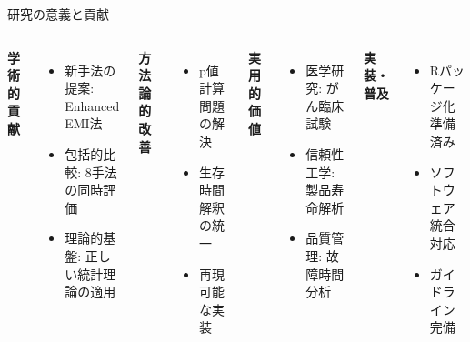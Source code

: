 \documentclass[11pt,aspectratio=169]{beamer}
\begin{document}
\begin{frame}{研究の意義と貢献}
\begin{columns}
\textbf{学術的貢献}
\begin{itemize}
\item \textcolor{primary}{新手法の提案}: Enhanced EMI法
\item \textcolor{primary}{包括的比較}: 8手法の同時評価
\item \textcolor{primary}{理論的基盤}: 正しい統計理論の適用
\end{itemize}

\vspace{1em}
\textbf{方法論的改善}
\begin{itemize}
\item p値計算問題の解決
\item 生存時間解釈の統一
\item 再現可能な実装
\end{itemize}

\textbf{実用的価値}
\begin{itemize}
\item \textcolor{secondary}{医学研究}: がん臨床試験
\item \textcolor{secondary}{信頼性工学}: 製品寿命解析
\item \textcolor{secondary}{品質管理}: 故障時間分析
\end{itemize}

\vspace{1em}
\textbf{実装・普及}
\begin{itemize}
\item Rパッケージ化準備済み
\item ソフトウェア統合対応
\item ガイドライン完備
\end{itemize}
\end{columns}
\end{frame}
\end{document}
